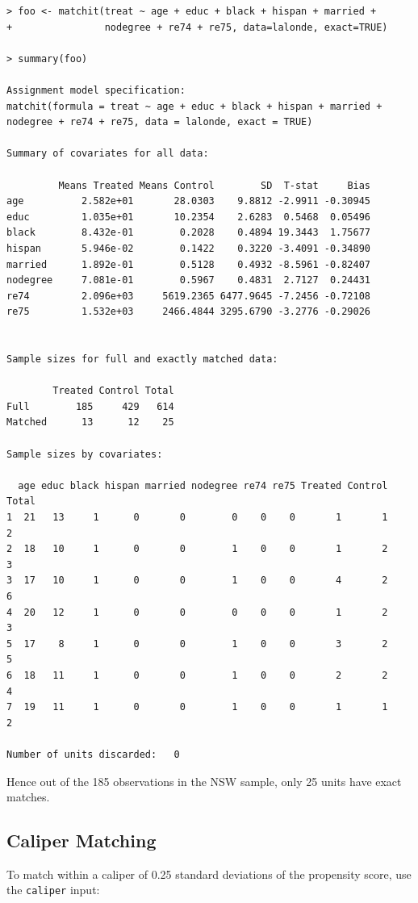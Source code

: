 \documentclass[oneside,letterpaper,titlepage]{article}
\begin{document}
\begin{verbatim}
> foo <- matchit(treat ~ age + educ + black + hispan + married +
+                nodegree + re74 + re75, data=lalonde, exact=TRUE)

> summary(foo)
 
Assignment model specification:
matchit(formula = treat ~ age + educ + black + hispan + married +     nodegree + re74 + re75, data = lalonde, exact = TRUE)
 
Summary of covariates for all data:
 
         Means Treated Means Control        SD  T-stat     Bias
age          2.582e+01       28.0303    9.8812 -2.9911 -0.30945
educ         1.035e+01       10.2354    2.6283  0.5468  0.05496
black        8.432e-01        0.2028    0.4894 19.3443  1.75677
hispan       5.946e-02        0.1422    0.3220 -3.4091 -0.34890
married      1.892e-01        0.5128    0.4932 -8.5961 -0.82407
nodegree     7.081e-01        0.5967    0.4831  2.7127  0.24431
re74         2.096e+03     5619.2365 6477.9645 -7.2456 -0.72108
re75         1.532e+03     2466.4844 3295.6790 -3.2776 -0.29026
 
 
Sample sizes for full and exactly matched data:
 
        Treated Control Total
Full        185     429   614
Matched      13      12    25
 
Sample sizes by covariates:
 
  age educ black hispan married nodegree re74 re75 Treated Control Total
1  21   13     1      0       0        0    0    0       1       1     2
2  18   10     1      0       0        1    0    0       1       2     3
3  17   10     1      0       0        1    0    0       4       2     6
4  20   12     1      0       0        0    0    0       1       2     3
5  17    8     1      0       0        1    0    0       3       2     5
6  18   11     1      0       0        1    0    0       2       2     4
7  19   11     1      0       0        1    0    0       1       1     2
 
Number of units discarded:   0
\end{verbatim}


Hence out of the 185 observations in the NSW sample, only 25 units have exact
matches. 

\subsection{Caliper Matching}

To match within a caliper of 0.25 standard deviations of the
propensity score, use the \texttt{caliper} input:
\end{document}
